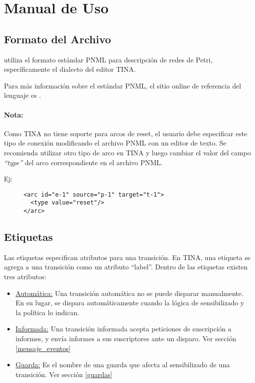 \section{Manual de Uso}

\subsection{Formato del Archivo}

\javapetriconcurrencymonitor utiliza el formato estándar PNML para descripción
de redes de Petri, específicamente el dialecto del editor TINA\cite{TinaSite}.

Para más información sobre el estándar PNML, el sitio online de referencia del
lenguaje es \cite{PnmlSite}.

\begin{framed}
\paragraph{Nota:}
Como TINA no tiene soporte para arcos de reset, el usuario debe especificar
este tipo de conexión modificando el archivo PNML con un editor de texto.
Se recomienda utilizar otro tipo de arco en TINA y luego cambiar el valor del
campo \textit{``type''} del arco correspondiente en el archivo PNML.

Ej:
\begin{figure}[H]
\centering
\begin{verbatim}
<arc id="e-1" source="p-1" target="t-1">
  <type value="reset"/>
</arc>
\end{verbatim}
\end{figure}
\end{framed}

\subsection{Etiquetas}

Las etiquetas especifican atributos para una transición. En TINA, una etiqueta
se agrega a una transición como un atributo ``label''.
Dentro de las etiquetas existen tres atributos:

\begin{itemize}
    \item \underline{Automática:} Una transición automática no se puede disparar
    manualmente. En su lugar, se dispara automáticamente cuando la lógica de
    sensibilizado y la política lo indican.
    \item \underline{Informada:} Una transición informada acepta peticiones de
    suscripción a informes, y envía informes a sus suscriptores ante un disparo.
    Ver sección \ref{mensaje_eventos}
    \item \underline{Guarda:} Es el nombre de una guarda que afecta
    al sensibilizado de una transición. Ver sección \ref{guardas}
\end{itemize}

